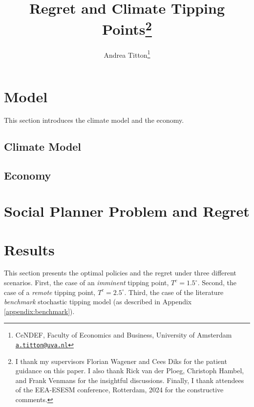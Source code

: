 \documentclass[12pt]{article}
\author{Andrea Titton\thanks{CeNDEF, Faculty of Economics and Business, University of Amsterdam
    \href{mailto:a.titton@uva.nl}{\texttt{a.titton@uva.nl}}}}
\title{Regret and Climate Tipping Points\thanks{
      I thank my supervisors Florian Wagener and Cees Diks for the patient guidance on this paper. I also thank Rick van der Ploeg, Christoph Hambel, and Frank Venmans for the insightful discussions. Finally, I thank attendees of the EEA-ESESM conference, Rotterdam, 2024 for the constructive comments.
    }}
\begin{document}
\maketitle

\iffalse
\begin{abstract}
  Climate tipping points can lead to abrupt climate change and the costs associated with it.
\end{abstract}
\fi

\newpage


\section{Model}

This section introduces the climate model and the economy.

\subsection{Climate Model}



\subsection{Economy}




\section{Social Planner Problem and Regret}



\section{Results}

This section presents the optimal policies and the regret under three different scenarios. First, the case of an \textit{imminent} tipping point, $T^c = 1.5^{\circ}$. Second, the case of a \textit{remote} tipping point, $T^c = 2.5^{\circ}$. Third, the case of the literature \textit{benchmark} stochastic tipping model (as described in Appendix \ref{appendix:benchmark}).



\end{document}

